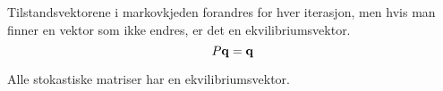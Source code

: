 Tilstandsvektorene i markovkjeden forandres for hver iterasjon,
men hvis man finner en vektor som ikke endres, er det en ekvilibriumsvektor.
$$P\mathbf{q} = \mathbf{q}$$

Alle stokastiske matriser har en ekvilibriumsvektor.
